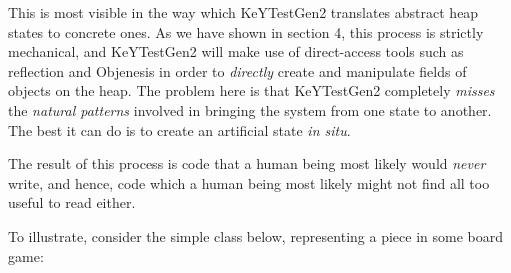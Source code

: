 \documentclass{article}
\newcommand{\tmem}[1]{{\em #1\/}}
\begin{document}
This is most visible in the way which KeYTestGen2 translates abstract heap
states to concrete ones. As we have shown in section 4, this process is
strictly mechanical, and KeYTestGen2 will make use of direct-access tools such
as reflection and Objenesis in order to {\tmem{directly}} create and
manipulate fields of objects on the heap. The problem here is that KeYTestGen2
completely {\tmem{misses}} the {\tmem{natural patterns}} involved in bringing
the system from one state to another. The best it can do is to create an
artificial state {\tmem{in situ}}.

The result of this process is code that a human being most likely would
{\tmem{never}} write, and hence, code which a human being most likely might
not find all too useful to read either.



To illustrate, consider the simple class below, representing a piece in some
board game:
\end{document}
